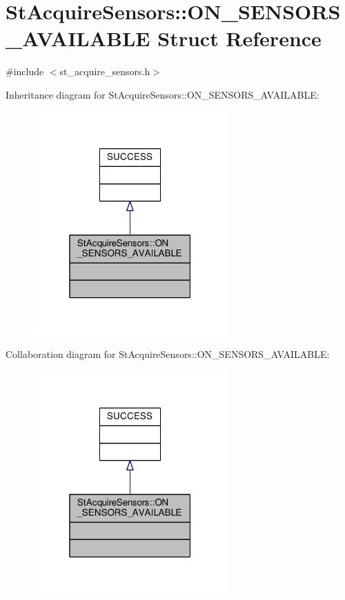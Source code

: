 \hypertarget{structStAcquireSensors_1_1ON__SENSORS__AVAILABLE}{}\section{St\+Acquire\+Sensors\+:\+:O\+N\+\_\+\+S\+E\+N\+S\+O\+R\+S\+\_\+\+A\+V\+A\+I\+L\+A\+B\+LE Struct Reference}
\label{structStAcquireSensors_1_1ON__SENSORS__AVAILABLE}


{\ttfamily \#include $<$st\+\_\+acquire\+\_\+sensors.\+h$>$}



Inheritance diagram for St\+Acquire\+Sensors\+:\+:O\+N\+\_\+\+S\+E\+N\+S\+O\+R\+S\+\_\+\+A\+V\+A\+I\+L\+A\+B\+LE\+:
\nopagebreak
\begin{figure}[H]
\begin{center}
\leavevmode
\includegraphics[width=211pt]{structStAcquireSensors_1_1ON__SENSORS__AVAILABLE__inherit__graph}
\end{center}
\end{figure}


Collaboration diagram for St\+Acquire\+Sensors\+:\+:O\+N\+\_\+\+S\+E\+N\+S\+O\+R\+S\+\_\+\+A\+V\+A\+I\+L\+A\+B\+LE\+:
\nopagebreak
\begin{figure}[H]
\begin{center}
\leavevmode
\includegraphics[width=211pt]{structStAcquireSensors_1_1ON__SENSORS__AVAILABLE__coll__graph}
\end{center}
\end{figure}



